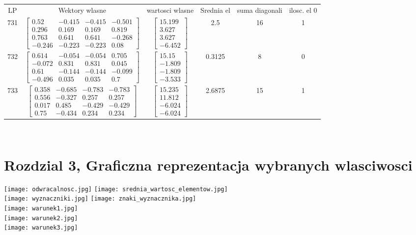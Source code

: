\documentclass[a4paper,12pt]{article}
\begin{document}
\bgroup {} \vspace{0.2in} \begin{tabular}{c c c c c c}
LP &Wektory wlasne & wartosci wlasne & Srednia el & suma diagonali & ilosc. el 0\\
731
&
$\begin{bmatrix} 0.52 & -0.415 & -0.415 & -0.501 \\ 0.296 & 0.169 & 0.169 & 0.819 \\ 0.763 & 0.641 & 0.641 & -0.268 \\ -0.246 & -0.223 & -0.223 & 0.08 \end{bmatrix}$
&
$\begin{bmatrix} 15.199 \\ 3.627 \\ 3.627 \\ -6.452 \end{bmatrix}$
&
2.5
&
16
&
1
\\
732
&
$\begin{bmatrix} 0.614 & -0.054 & -0.054 & 0.705 \\ -0.072 & 0.831 & 0.831 & 0.045 \\ 0.61 & -0.144 & -0.144 & -0.099 \\ -0.496 & 0.035 & 0.035 & 0.7 \end{bmatrix}$
&
$\begin{bmatrix} 15.15 \\ -1.809 \\ -1.809 \\ -3.533 \end{bmatrix}$
&
0.3125
&
8
&
0
\\
733
&
$\begin{bmatrix} 0.358 & -0.685 & -0.783 & -0.783 \\ 0.556 & -0.327 & 0.257 & 0.257 \\ 0.017 & 0.485 & -0.429 & -0.429 \\ 0.75 & -0.434 & 0.234 & 0.234 \end{bmatrix}$
&
$\begin{bmatrix} 15.235 \\ 11.812 \\ -6.024 \\ -6.024 \end{bmatrix}$
&
2.6875
&
15
&
1
\\
\end{tabular} \ \newpage
\vspace*{\fill}\begingroup\section{Rozdzial 3, Graficzna reprezentacja wybranych wlasciwosci}\endgroup
\vspace*{\fill}\newpage
\texttt{[image: odwracalnosc.jpg]}
\texttt{[image: srednia\_wartosc\_elementow.jpg]}\\
\texttt{[image: wyznaczniki.jpg]}
\texttt{[image: znaki\_wyznacznika.jpg]}\\
\texttt{[image: warunek1.jpg]}\\
\texttt{[image: warunek2.jpg]}\\
\texttt{[image: warunek3.jpg]}
\end{document}
